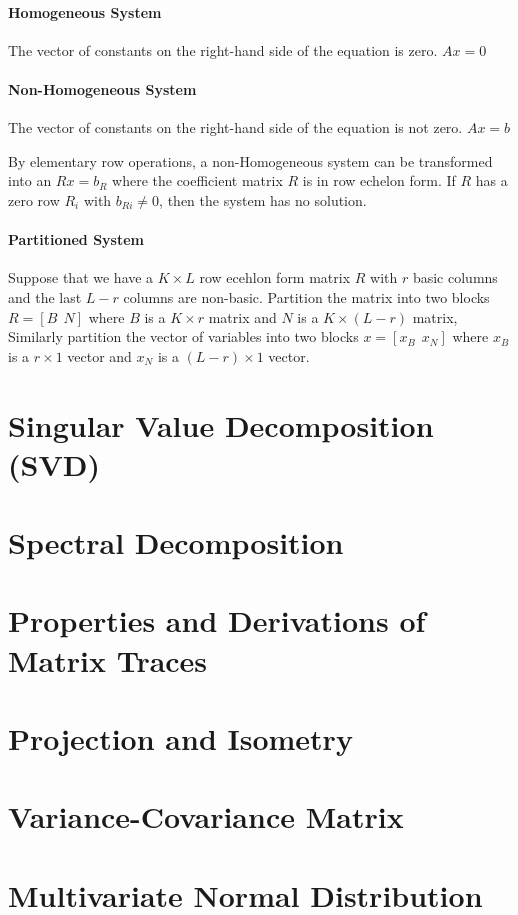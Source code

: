 \documentclass{article}
\theoremstyle{definition}
\theoremstyle{remark}
\begin{document}
\paragraph{Homogeneous System} 

The vector of constants on the right-hand side of the equation is zero. $Ax = 0$

\paragraph{Non-Homogeneous System}

The vector of constants on the right-hand side of the equation is not zero. $Ax = b$

By elementary row operations, a non-Homogeneous system can be transformed into an $Rx = b_R$ where the coefficient matrix $R$ is in row echelon form. If $R$ has a zero row $R_i$ with $b_{Ri} \neq 0$, then the system has no solution. 

\paragraph{Partitioned System}

Suppose that we have a $K \times L$ row ecehlon form matrix $R$ with $r$ basic columns and the last $L - r$ columns are non-basic. Partition the matrix into two blocks $R = [B~~N]$ where $B$ is a $K \times r$ matrix and $N$ is a $K \times (L-r)$ matrix, Similarly partition the vector of variables into two blocks $x = [x_B~~x_N]$ where $x_B$ is a $r \times 1$ vector and $x_N$ is a $(L-r) \times 1$ vector.

\section{Singular Value Decomposition (SVD)}

\section{Spectral Decomposition}

\section{Properties and Derivations of Matrix Traces}

\section{Projection and Isometry}

\section{Variance-Covariance Matrix}

\section{Multivariate Normal Distribution}
\end{document}
